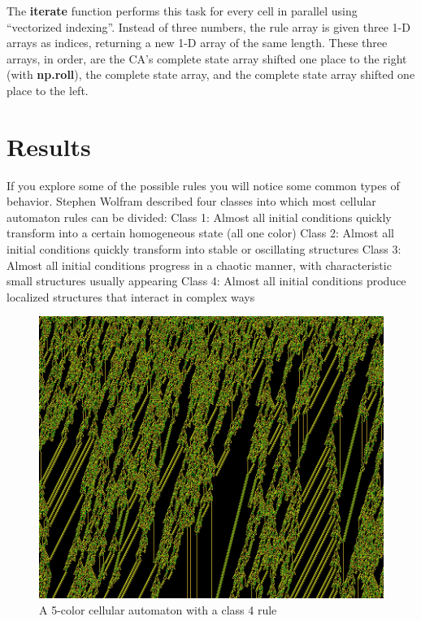 \documentclass[12pt]{article}
\begin{document}
The \textbf{iterate} function performs this task for every cell in parallel using ``vectorized indexing''.
Instead of three numbers, the rule array is given three 1-D arrays as indices, returning a new 1-D array of the same length.
These three arrays, in order, are the CA's complete state array shifted one place to the right (with \textbf{np.roll}), the complete state array, and the complete state array shifted one place to the left.

\section{Results}
If you explore some of the possible rules you will notice some common types of behavior.  Stephen Wolfram described four classes into which most cellular automaton rules can be divided:
\newline
Class 1:  Almost all initial conditions quickly transform into a certain homogeneous state (all one color)
\newline
Class 2:  Almost all initial conditions quickly transform into stable or oscillating structures
\newline
Class 3:  Almost all initial conditions progress in a chaotic manner, with characteristic small structures usually appearing
\newline
Class 4:  Almost all initial conditions produce localized structures that interact in complex ways

\begin{figure}[h]
\begin{center}
\includegraphics[width=\linewidth]{Class4CA}
\end{center}
\caption{A 5-color cellular automaton with a class 4 rule}
\end{figure}
\end{document}
